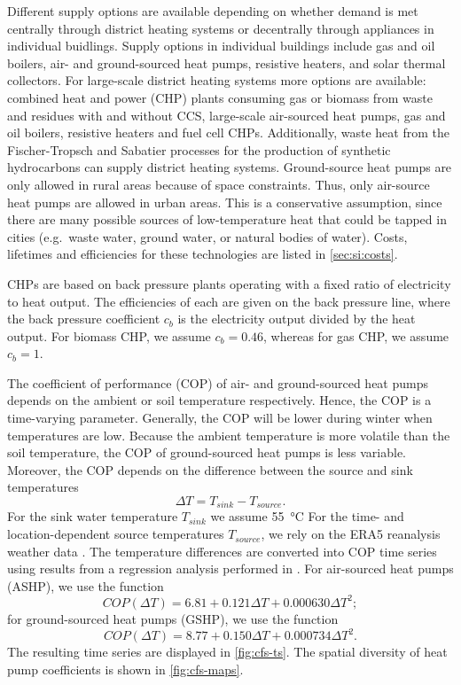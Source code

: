 Different supply options are available depending on whether demand is met
centrally through district heating systems or decentrally through appliances in
individual buidlings. Supply options in individual buildings include gas and oil
boilers, air- and ground-sourced heat pumps, resistive heaters, and solar
thermal collectors. For large-scale district heating systems more options are
available: combined heat and power (CHP) plants consuming gas or biomass from
waste and residues with and without CCS, large-scale air-sourced
heat pumps, gas and oil boilers, resistive heaters and fuel cell CHPs.
Additionally, waste heat from the Fischer-Tropsch and Sabatier processes for the
production of synthetic hydrocarbons can supply district heating systems.
Ground-source heat pumps are only allowed in rural areas because of space constraints.
Thus, only air-source heat pumps are allowed in urban areas. This is a conservative
assumption, since there are many possible sources of low-temperature heat that
could be tapped in cities (e.g.~waste water, ground water, or natural bodies of water).
Costs, lifetimes and efficiencies for these technologies are listed in \cref{sec:si:costs}.


CHPs are based on back pressure plants operating with a fixed ratio of
electricity to heat output. The efficiencies of each are given on the back
pressure line, where the back pressure coefficient $c_b$ is the electricity
output divided by the heat output. For biomass CHP, we assume $c_b=0.46$,
whereas for gas CHP, we assume $c_b=1$.


The coefficient of performance (COP) of air- and ground-sourced heat pumps
depends on the ambient or soil temperature respectively. Hence, the COP is a
time-varying parameter. Generally, the COP will be lower during winter when
temperatures are low. Because the ambient temperature is more volatile than the
soil temperature, the COP of ground-sourced heat pumps is less variable.
Moreover, the COP depends on the difference between the source and sink
temperatures
\begin{equation}
    \Delta T = T_{sink} - T_{source}.
\end{equation}
For the sink water temperature $T_{sink}$ we assume \SI{55}{\celsius} For the
time- and location-dependent source temperatures $T_{source}$, we rely on the
ERA5 reanalysis weather data \citeS{}. The temperature differences are converted
into COP time series using results from a regression analysis performed in
. For air-sourced heat pumps (ASHP), we use
the function
\begin{equation}
    COP(\Delta T) = 6.81 + 0.121 \Delta T + 0.000630 \Delta T^2;
\end{equation}
for ground-sourced heat pumps (GSHP), we use the function
\begin{equation}
    COP(\Delta T) = 8.77 + 0.150 \Delta T + 0.000734 \Delta T^2.
\end{equation}
The resulting time series are displayed in \cref{fig:cfs-ts}.
The spatial diversity of heat pump coefficients is shown in \cref{fig:cfs-maps}.

